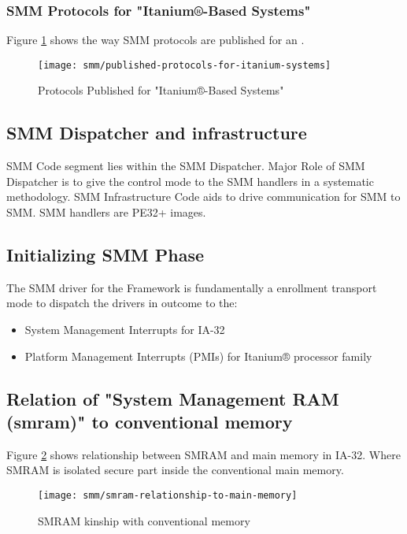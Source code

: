 \subsubsection{SMM Protocols for "Itanium®-Based Systems"}
Figure \ref{fig:published-protocols-for-itanium-systems} shows the way SMM protocols are published for an .
\begin{figure}[!htbp]
	\centering
	\texttt{[image: smm/published-protocols-for-itanium-systems]}
	\caption{Protocols Published for "Itanium®-Based Systems"}\label{fig:published-protocols-for-itanium-systems}
\end{figure}


\subsection{SMM Dispatcher and infrastructure}
SMM Code segment lies within the SMM Dispatcher. Major Role of SMM Dispatcher is to give the control mode to the SMM handlers in a systematic methodology. SMM Infrastructure Code aids to drive communication for SMM to SMM. SMM handlers are PE32+ images.

\subsection{Initializing SMM Phase}
The SMM driver for the Framework is fundamentally a enrollment transport mode to dispatch the drivers in outcome to the:
\begin{itemize}
	\item System Management Interrupts for IA-32
	\item Platform Management Interrupts (PMIs) for Itanium® processor family
\end{itemize}

\subsection{Relation of "System Management RAM (\gls{smram})" to conventional memory}
Figure \ref{fig:smram-relationship-to-main-memory} shows relationship between SMRAM and main memory in IA-32. Where SMRAM is isolated secure part inside the conventional main memory.

\begin{figure}[!htbp]
	\centering
	\texttt{[image: smm/smram-relationship-to-main-memory]}
	\caption{SMRAM kinship with conventional memory}\label{fig:smram-relationship-to-main-memory}
\end{figure}

